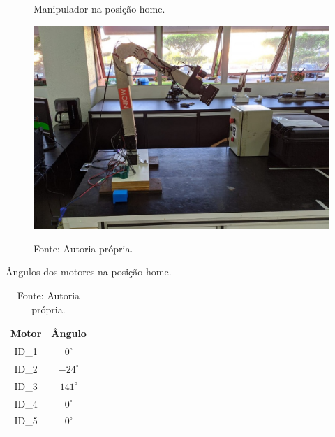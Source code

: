 \begin{figure}[H]
    \centering
    \caption{Manipulador na posição home.}
    \includegraphics[scale=0.4]{images/home_position.jpg}
    \label{fig:home_position}
    \caption*{Fonte: Autoria própria.}
\end{figure}

\begin{table}[H]
    \centering
    \caption{Ângulos dos motores na posição home.}
    \begin{tabular}{|c|c|}
    \hline
    \rowcolor[HTML]{EFEFEF} 
    \textbf{Motor} & \textbf{Ângulo}                           \\ \hline
    \rowcolor[HTML]{FFFFFF} 
    ID\_1          & $0^\circ$   \\ \hline
    ID\_2          & $-24^\circ$ \\ \hline
    \rowcolor[HTML]{FFFFFF} 
    ID\_3          & $141^\circ$ \\ \hline
    ID\_4          & $0^\circ$   \\ \hline
    \rowcolor[HTML]{FFFFFF} 
    ID\_5          & $0^\circ$   \\ \hline
    \end{tabular}
    \label{tab:home_position}
    \caption*{Fonte: Autoria própria.}
    \end{table}


